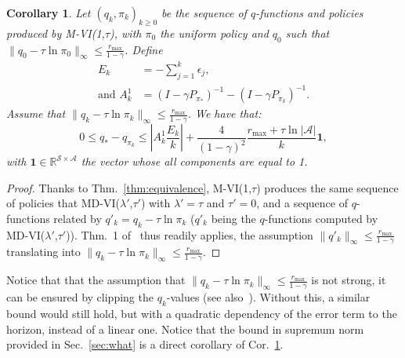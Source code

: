 \documentclass{article}
\newtheorem{cor}{Corollary}
\newcommand{\states}{\mathcal{S}}
\newcommand{\actions}{\mathcal{A}}
\newcommand{\un}{\mathbf{1}}
\begin{document}
\begin{cor}
\label{cor:alpha_equal_one}
    Let $(q_k,\pi_k)_{k\geq 0}$ be the sequence of $q$-functions and policies produced by M-VI(1,$\tau$), with $\pi_0$ the uniform policy and $q_0$ such that $\|q_0 - \tau \ln \pi_0\|_\infty\leq \frac{r_\text{max}}{1-\gamma}$. Define
    \begin{align}
        E_k &= -\sum_{j=1}^k \epsilon_j,
        \\
        \text{and }
        A_k^1 &= (I-\gamma P_{\pi_*})^{-1} - (I-\gamma P_{\pi_{k}})^{-1}.
    \end{align}
    Assume that $\|q_k - \tau\ln\pi_{k}\|_\infty \leq \frac{r_\text{max}}{1-\gamma}$. We have that:
    \begin{equation}
        0 \leq q_* - q_{\pi_{k}} \leq \left|A^1_k \frac{E_k}{k}\right| + 
        \frac{4}{(1-\gamma)^2} \frac{r_\text{max}+\tau\ln|\actions|}{k} \un,
    \end{equation}
    with $\un\in\mathbb{R}^{\states\times\actions}$ the vector whose all components are equal to 1.
\end{cor}
\begin{proof}
    Thanks to Thm.~\ref{thm:equivalence}, M-VI(1,$\tau$) produces the same sequence of policies that MD-VI($\lambda'$,$\tau'$) with $\lambda'=\tau$ and $\tau'=0$, and a sequence of $q$-functions related by $q'_k = q_k - \tau \ln \pi_k$ ($q'_k$ being the $q$-functions computed by MD-VI($\lambda'$,$\tau'$)). Thm.~1 of~\citet{vieillard2020leverage} thus readily applies, the assumption $\|q'_k\|_\infty \leq \frac{r_\text{max}}{1-\gamma}$ translating into $\|q_k - \tau\ln\pi_{k}\|_\infty \leq \frac{r_\text{max}}{1-\gamma}$.
\end{proof}

Notice that that the assumption that $\|q_k - \tau\ln\pi_k\|_\infty \leq \frac{r_\text{max}}{1-\gamma}$ is not strong, it can be ensured by clipping the $q_k$-values (see also~\cite[Rk.~1]{vieillard2020leverage}). Without this, a similar bound would still hold, but with a quadratic dependency of the error term to the horizon, instead of a linear one. Notice that the bound in supremum norm provided in Sec.~\ref{sec:what} is a direct corollary of Cor.~\ref{cor:alpha_equal_one}.
\end{document}

